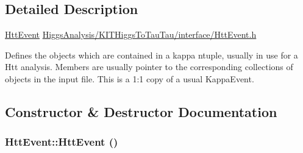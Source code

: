 \subsection{Detailed Description}
\hyperlink{classHttEvent}{HttEvent} \hyperlink{HttEvent_8h}{HiggsAnalysis/KITHiggsToTauTau/interface/HttEvent.h}

Defines the objects which are contained in a kappa ntuple, usually in use for a Htt analysis. Members are usually pointer to the corresponding collections of objects in the input file. This is a 1:1 copy of a usual KappaEvent. 

\subsection{Constructor \& Destructor Documentation}
\hypertarget{classHttEvent_adb37c8d249d0c49210cd01694f7b6e92}{
\subsubsection[{HttEvent}]{\setlength{\rightskip}{0pt plus 5cm}HttEvent::HttEvent ()}}
\label{classHttEvent_adb37c8d249d0c49210cd01694f7b6e92}


